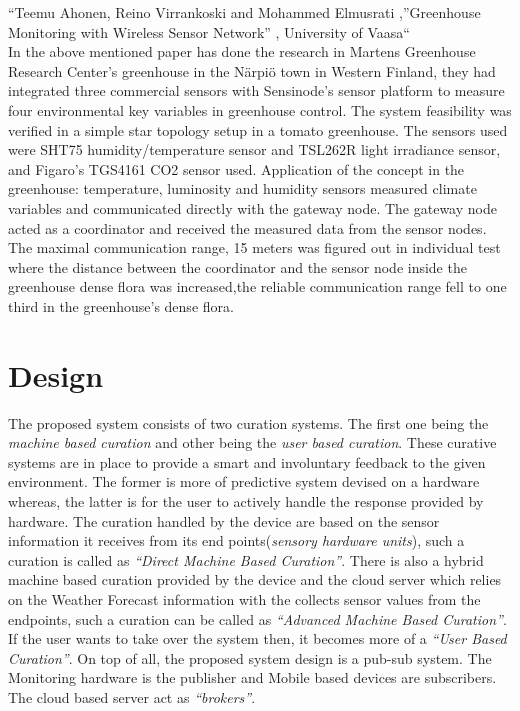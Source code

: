 \documentclass[10pt]{article}
\begin{document}
“Teemu Ahonen, Reino Virrankoski and Mohammed Elmusrati ,”Greenhouse Monitoring with Wireless Sensor Network” , University of Vaasa“\\


In the above mentioned paper has done the research in Martens Greenhouse Research Center’s greenhouse in the Närpiö town in Western Finland, they had integrated three commercial sensors with Sensinode’s sensor platform to measure four environmental key variables in greenhouse control.
The system feasibility was verified in a simple star topology setup in a tomato greenhouse.
The sensors used were SHT75 humidity/temperature sensor and TSL262R light irradiance sensor, and Figaro’s TGS4161 CO2 sensor used. 
Application of the concept in the greenhouse: temperature, luminosity and humidity sensors measured climate variables and communicated directly with the gateway node. 
The gateway node acted as a coordinator and received the measured data from the sensor nodes. 
The maximal communication range, 15 meters was figured out in individual test where the distance between the coordinator and the sensor node inside the greenhouse dense flora was increased,the reliable communication range fell to one third in the greenhouse's dense flora. 

\section*{Design}

The proposed system consists of two curation systems. 
The first one being the \emph{machine based curation} and other being the \emph{user based curation}. 
These curative systems are in place to provide a smart and involuntary feedback to the given environment. 
The former is more of predictive system devised on a hardware whereas, the latter is for the user to actively handle the response provided by hardware. 
The curation handled by the device are based on the sensor information it receives from its end points(\emph{sensory hardware units}), such a curation is called as \emph{``Direct Machine Based Curation''}. 
There is also a hybrid machine based curation provided by the device and the cloud server which relies on the Weather Forecast information with the collects sensor values from the endpoints, such a curation can be called as \emph{``Advanced Machine Based Curation''}. 
If the user wants to take over the system then, it becomes more of a \emph{``User Based Curation''}. 
On top of all, the proposed system design is a pub-sub system. 
The Monitoring hardware is the publisher and Mobile based devices are subscribers. 
The cloud based server act as \emph{``brokers''}. 
\end{document}
